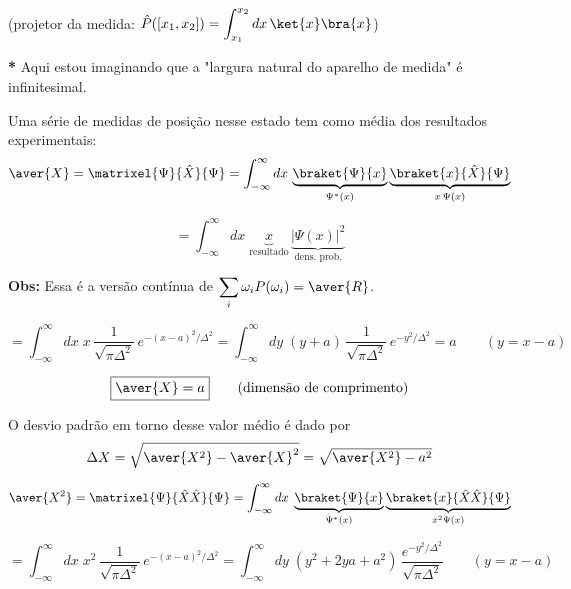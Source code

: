 \noindent (projetor da medida: $\displaystyle \hat{P}([x_1,x_2]) = \int_{x_1}^{x_2} dx\, \ket{x}\bra{x}$)

\bigskip
\noindent\textbf{*} Aqui estou imaginando que a "largura natural do aparelho de medida" é infinitesimal.

Uma série de medidas de posição nesse estado tem como média dos resultados experimentais:
\begin{equation}
    \aver{X} = \matrixel{\Psi}{\hat{X}}{\Psi} = \int_{-\infty}^{\infty} dx \, \underbrace{\braket{\Psi}{x}}_{\Psi^*(x)}\underbrace{\braket{x}{\hat{X}}{\Psi}}_{x\,\Psi(x)}
\label{eq:aula12_X_medio_def}
\end{equation}

\begin{equation}
    = \int_{-\infty}^{\infty} dx\; \underbrace{x}_{\text{resultado}}\, \underbrace{|\Psi(x)|^2}_{\text{dens. prob.}}
\label{eq:aula12_X_medio_integral}
\end{equation}

\noindent\textbf{Obs:} Essa é a versão contínua de $\displaystyle\sum_i \omega_i P(\omega_i) = \aver{R}$.

\begin{equation}
    = \int_{-\infty}^{\infty} dx\; x\, \frac{1}{\sqrt{\pi\Delta^2}}\, e^{-(x-a)^2/\Delta^2}
    = \int_{-\infty}^{\infty} dy\; (y+a)\, \frac{1}{\sqrt{\pi\Delta^2}}\, e^{-y^2/\Delta^2} = a \qquad (y = x-a)
\label{eq:aula12_X_medio_calculo}
\end{equation}

\begin{equation}
    \boxed{\aver{X} = a} \qquad \text{(dimensão de comprimento)}
\label{eq:aula12_X_medio_resultado}
\end{equation}

O desvio padrão em torno desse valor médio é dado por
\begin{equation}
    \Delta X = \sqrt{\aver{X^2} - \aver{X}^2} = \sqrt{\aver{X^2} - a^2}
\label{eq:aula12_deltaX_def}
\end{equation}

\begin{equation}
    \aver{X^2} = \matrixel{\Psi}{\hat{X}\hat{X}}{\Psi} = \int_{-\infty}^{\infty} dx\; \underbrace{\braket{\Psi}{x}}_{\Psi^*(x)}\underbrace{\braket{x}{\hat{X}\hat{X}}{\Psi}}_{x^2\Psi(x)}
\label{eq:aula12_X2_medio_def}
\end{equation}

\begin{equation}
    = \int_{-\infty}^{\infty} dx\; x^2\, \frac{1}{\sqrt{\pi\Delta^2}}\, e^{-(x-a)^2/\Delta^2}
    = \int_{-\infty}^{\infty} dy\; (y^2+2ya+a^2)\, \frac{e^{-y^2/\Delta^2}}{\sqrt{\pi\Delta^2}} \qquad (y=x-a)
\label{eq:aula12_X2_medio_calculo}
\end{equation}


